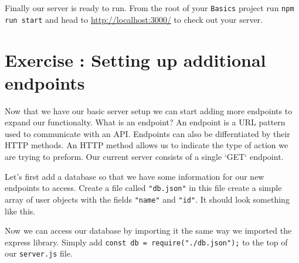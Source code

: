 \documentclass{42-en}
\begin{document}
	Finally our server is ready to run. From the root of your \texttt{Basics} project run \texttt{npm run start} and head to \href{http://localhost:3000/}{http://localhost:3000/} to check out your server.


\newpage
\nextexercice


\chapter{Exercise \exercicenumber: Setting up additional endpoints}

    Now that we have our basic server setup we can start adding more endpoints to expand our functionalty. What is an endpoint? An endpoint is a URL pattern used to communicate with an API. Endpoints can also be differntiated by their HTTP methods. An HTTP method allows us to indicate the type of action we are trying to preform. Our current server consists of a single `GET` endpoint.


    Let's first add a database so that we have some information for our new endpoints to access. Create a file called \texttt{"db.json"} in this file create a simple array of user objects with the fields \texttt{"name"} and \texttt{"id"}. It should look something like this.
\begin{42jscode}
\end{42jscode}

    Now we can access our database by importing it the same way we imported the express library. Simply add \texttt{const db = require("./db.json");} to the top of our \texttt{server.js} file.
\end{document}
